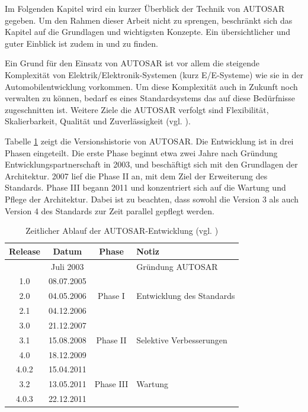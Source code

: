 \documentclass[
  a4paper,					    %
  twoside,
  DIV=calc,     				%
  bibliography=totoc,
  cleardoublepage=empty,
  ngerman,     					%
  final       					%
]{scrbook}
\begin{document}
Im Folgenden Kapitel wird ein kurzer Überblick der Technik von AUTOSAR gegeben. Um den Rahmen dieser Arbeit nicht zu sprengen, beschränkt sich das Kapitel auf die Grundlagen und wichtigsten Konzepte. Ein übersichtlicher und guter Einblick ist zudem in \cite{autosar_layer} und \cite{autosar_techoverview} zu finden.

Ein Grund für den Einsatz von AUTOSAR ist vor allem die steigende Komplexität von Elektrik/Elektronik-Systemen (kurz E/E-Systeme) wie sie in der Automobilentwicklung vorkommen. Um diese Komplexität auch in Zukunft noch verwalten zu können, bedarf es eines Standardsystems das auf diese Bedürfnisse zugeschnitten ist. Weitere Ziele die AUTOSAR verfolgt sind Flexibilität, Skalierbarkeit, Qualität und Zuverlässigkeit (vgl. \cite[S. 5]{autosar_techoverview}).

Tabelle \ref{tab:timeline} zeigt die Versionshistorie von AUTOSAR. Die Entwicklung ist in drei Phasen eingeteilt. Die erste Phase beginnt etwa zwei Jahre nach Gründung Entwicklungspartnerschaft in 2003, und beschäftigt sich mit den Grundlagen der Architektur. 2007 lief die Phase II an, mit dem Ziel der Erweiterung des Standards. Phase III begann 2011 und konzentriert sich auf die Wartung und Pflege der Architektur. Dabei ist zu beachten, dass sowohl die Version 3 als auch Version 4 des Standards zur Zeit parallel gepflegt werden.

\begin{table}[h]
    \centering
    \begin{tabular}[h]{c c c l}
    \toprule
    Release & Datum & Phase & Notiz\\
    \midrule
          & Juli 2003  &  & Gründung AUTOSAR\\
    \midrule
    1.0   & 08.07.2005 & \multirow{3}{*}{Phase I} & \\
    2.0	  & 04.05.2006 &  & Entwicklung des Standards\\
    2.1	  & 04.12.2006 &  & \\
    \midrule
    3.0	  & 21.12.2007 & \multirow{3}{*}{Phase II} & \\
    3.1	  & 15.08.2008 &  & Selektive Verbesserungen\\
    4.0	  & 18.12.2009 &  & \\
    \midrule
    4.0.2 & 15.04.2011 & \multirow{3}{*}{Phase III} & \\
    3.2	  & 13.05.2011 &  & Wartung\\
    4.0.3 & 22.12.2011 &  & \\
    \bottomrule
    \end{tabular}
    \caption{Zeitlicher Ablauf der AUTOSAR-Entwicklung (vgl. \cite{as_background}\cite{as_roadmap}\cite{wiki:autosar_de})}
    \label{tab:timeline}
\end{table}
\end{document}
